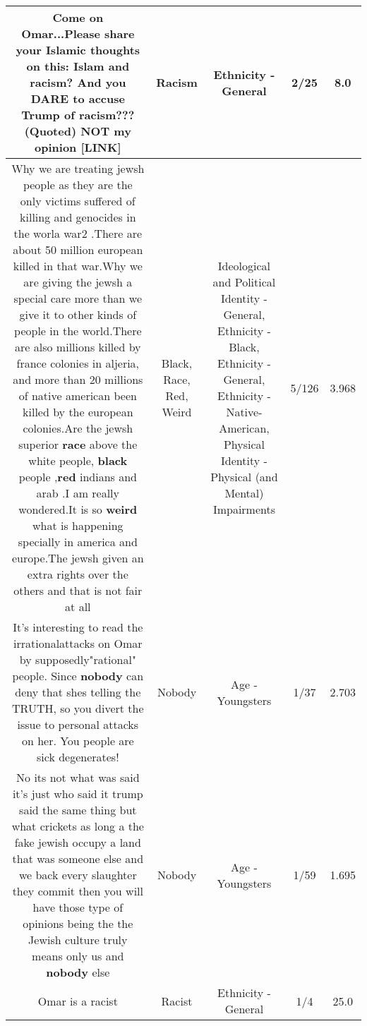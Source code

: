 \documentclass[11pt]{article}
\newlength\mylength
\begin{document}
\begin{center}
\begin{longtable}{|C{.65\mylength}|C{.30\mylength}|C{.12\mylength}|C{.12\mylength}|C{.12\mylength}|}
  \small Come on Omar...Please share your Islamic thoughts on this: Islam and \textbf{racism}? And you DARE to accuse Trump of \textbf{racism}??? (Quoted) NOT my opinion  [LINK] \normalsize   & Racism & Ethnicity - General & 2/25 & 8.0 \\  \hline
  \small Why we are treating jewsh people as they are the only victims suffered of killing and genocides in the worla war2 .There are about 50 million european killed in that war.Why we are giving the jewsh a special care more than we give it to other kinds of people in the world.There are also millions killed by france colonies in aljeria, and more than 20 millions of native american been killed by the european colonies.Are the jewsh superior \textbf{race} above the white people, \textbf{black} people ,\textbf{r\textbf{ed}} indians and arab .I am really wondered.It is so \textbf{weird} what is happening specially in america and europe.The jewsh given an extra rights over the others and that is not fair at all\normalsize   & Black, Race, Red, Weird &  Ideological and Political Identity - General, Ethnicity - Black, Ethnicity - General, Ethnicity - Native-American, Physical Identity - Physical (and Mental) Impairments & 5/126 & 3.968 \\  \hline
  \small It's interesting to read the irrationalattacks on Omar by supposedly"rational" people. Since \textbf{nobody} can deny that shes telling the TRUTH, so you divert the issue to personal attacks on her. You people are sick degenerates!\normalsize   & Nobody & Age - Youngsters & 1/37 & 2.703 \\  \hline
  \small No  its not what was said it's just who said it trump said the same thing but what crickets as long a the fake jewish occupy a land that was someone else and we back every slaughter they commit then you will have those type of opinions being the the Jewish culture truly means only us and \textbf{nobody} else\normalsize   & Nobody & Age - Youngsters & 1/59 & 1.695 \\  \hline
  \small Omar is a racist\normalsize   & Racist & Ethnicity - General & 1/4 & 25.0 \\  \hline

\end{longtable}
\end{center}
\end{document}
